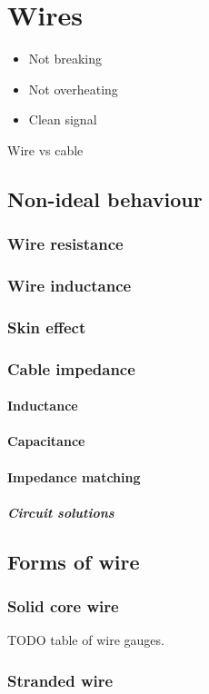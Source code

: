 \documentclass{report}
\begin{document}
\section{Wires}
\begin{itemize}
\item Not breaking
\item Not overheating
\item Clean signal
\end{itemize}
Wire vs cable
\subsection{Non-ideal behaviour}
\subsubsection{Wire resistance}
\subsubsection{Wire inductance}
\subsubsection{Skin effect}
\subsubsection{Cable impedance}
\paragraph{Inductance}
\paragraph{Capacitance}
\paragraph{Impedance matching}
\subparagraph{Circuit solutions}
\subsection{Forms of wire}
\subsubsection{Solid core wire}
TODO table of wire gauges.
\subsubsection{Stranded wire}
\end{document}
